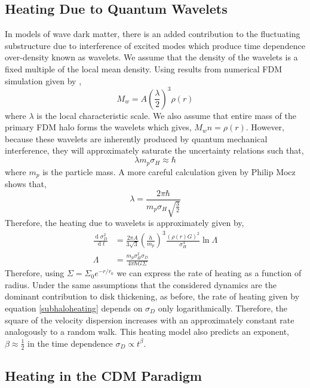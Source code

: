 \documentclass[usenatbib]{mnras}
\renewcommand{\d}[1]{\! \mathrm{d}#1 \:}
\newcommand{\deriv}[2]{\frac{\d{#1}}{\d{#2}}}
\renewcommand{\d}[1]{\ensuremath{\operatorname{d}\!{#1}}}
\begin{document}
\subsection{Heating Due to Quantum Wavelets}

In models of wave dark matter, there is an added contribution to the fluctuating substructure due to interference of excited modes which produce time dependence over-density known as wavelets. We assume that the density of the wavelets is a fixed multiple of the local mean density. Using results from numerical FDM simulation given by \cite{BECDM},
\begin{equation}
M_w = A \left(\frac{\lambda}{2} \right)^3 \rho(r) 
\end{equation}  
where $\lambda$ is the local characteristic scale. We also assume that entire mass of the primary FDM halo forms the wavelets which gives, $M_w n = \rho(r)$. However, because these wavelets are inherently produced by quantum mechanical interference, they will approximately saturate the uncertainty relations such that,
\begin{equation}
\lambda m_p \sigma_H \approx \hbar
\end{equation}
where $m_p$ is the particle mass. 
A more careful calculation given by Philip Mocz \citep{BECDM} shows that,
\[ \lambda = \frac{ 2 \pi \hbar}{m_p \sigma_H \sqrt{\frac{3}{2}}} \]
Therefore, the heating due to wavelets is approximately given by,
\begin{subequations} \label{FDMheating}
\begin{align}
\deriv{\sigma_D^2}{t} & = \frac{2 \pi A}{3 \sqrt{3}} \left( \frac{h}{m_p} \right)^3 \frac{(\rho(r) G)^2}{\sigma_H^4} \ln{\Lambda}
\\
\Lambda & = \frac{m_p\sigma_H^2 \sigma_D}{4 \pi \hbar G \Sigma}
\end{align}
\end{subequations}
Therefore, using $\Sigma = \Sigma_0 e^{-r/r_0}$ we can express the rate of heating as a function of radius. Under the same assumptions that the considered dynamics are the dominant contribution to disk thickening, as before, the rate of heating given by equation \ref{subhaloheating} depends on $\sigma_D$ only logarithmically. Therefore, the square of the velocity dispersion increases with an approximately constant rate analogously to a random walk. This heating model also predicts an exponent, $\beta \approx \tfrac{1}{2}$ in the time dependence $\sigma_D \propto t^{\beta}$.
\subsection{Heating in the CDM Paradigm}
\end{document}

